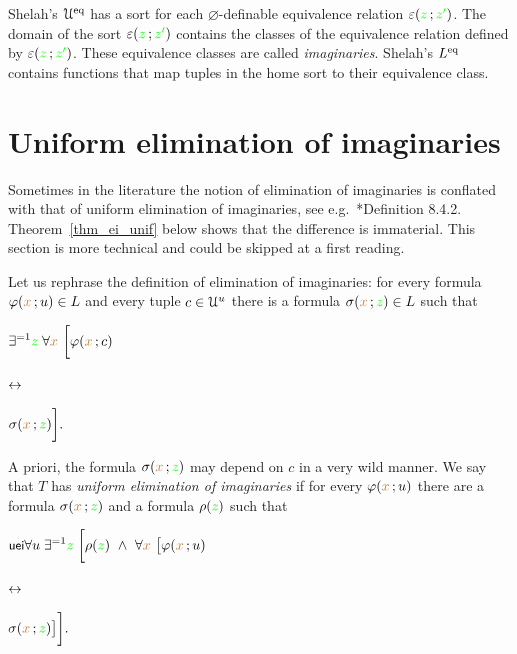Shelah's $\EuScript U^{{\rm eq}}$ has a sort for each $\varnothing$-definable equivalence relation $\varepsilon({\color{green} z}\,;{\color{green} z'})$.
The domain of the sort $\varepsilon({\color{green} z}\,;{\color{green} z'})$ contains the classes of the equivalence relation defined by $\varepsilon({\color{green} z}\,;{\color{green} z'})$.
These equivalence classes are called \emph{imaginaries}.
Shelah's $L^{{\rm eq}}$ contains functions that map tuples in the home sort to their equivalence class.


\section{Uniform elimination of imaginaries}

\def\medrel#1{\parbox[t]{5ex}{$\displaystyle\hfil #1$}}
\def\ceq#1#2#3{\parbox[t]{35ex}{$\displaystyle #1$}\medrel{#2}{$\displaystyle #3$}}

Sometimes in the literature the notion of elimination of imaginaries is conflated with that of uniform elimination of imaginaries, see e.g.~\cite{TZ}*{Definition 8.4.2}.
Theorem~\ref{thm_ei_unif} below shows that the difference is immaterial.
This section is more technical and could be skipped at a first reading.

Let us rephrase the definition of elimination of imaginaries: for every formula $\varphi({\color{brown} x}\,;u)\in L$ and every tuple $c\in\EuScript U^u$ there is a formula $\sigma({\color{brown} x}\,;{\color{green} z})\in L$ such that

\ceq{\hfill\E^{=1} {\gr z}\;\A {\mr x}\ \bigg[\phi({\mr x}\,;c)}{\iff}{\sigma({\mr x}\,;{\gr z})\bigg].}

A priori, the formula $\sigma({\color{brown} x}\,;{\color{green} z})$ may depend on $c$ in a very wild manner.
We say that $T$ has \emph{uniform elimination of imaginaries\/} if for every $\varphi({\color{brown} x}\,;u)$ there are a formula $\sigma({\color{brown} x}\,;{\color{green} z})$ and a formula $\rho({\color{green} z})$ such that 

\ceq{\ssf{uei}\hfill\A u\;\E^{=1} {\gr z}\;\bigg[\rho({\gr z})\ \wedge\ \A{\mr x}\ \big[\phi({\mr x}\,;u)}{\iff}{\sigma({\mr x}\,;{\gr z})\big]\bigg].}


